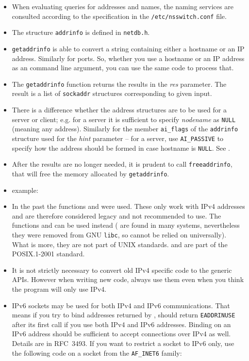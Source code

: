 \begin{itemize}
\item When evaluating queries for addresses and names, the naming services
are consulted according to the specification in the \texttt{/etc/nsswitch.conf}
file.
\item The structure \texttt{addrinfo} is defined in \texttt{netdb.h}.
\item \texttt{getaddrinfo} is able to convert a string containing either a
hostname or an IP address. Similarly for ports.  So, whether you use a hostname
or an IP address as an command line argument, you can use the same code to
process that.
\item The \texttt{getaddrinfo} function returns the results in the \emph{res}
parameter. The result is a list of \texttt{sockaddr} structures corresponding to
given input.
\item There is a difference whether the address structures are to be used for a
server or client; e.g. for a server it is sufficient to specify \emph{nodename}
as \texttt{NULL} (meaning any address).  Similarly for the member
\texttt{ai\_flags} of the \texttt{addrinfo} structure used for the \emph{hint}
parameter -- for a server, use \texttt{AI\_PASSIVE} to specify how the address
should be formed in case hostname is \texttt{NULL}.
See .
\item After the results are no longer needed, it is prudent to call
\texttt{freeaddrinfo}, that will free the memory allocated by
\texttt{getaddrinfo}.
\item {} example: 
\item In the past the functions  and
 were used. These only work with IPv4 addresses and are
therefore considered legacy and not recommended to use. The functions
 and  can be used
instead ( are found in many systems, nevertheless they were
removed from GNU \texttt{libc}, so cannot be relied on universally). What is
more, they are not part of UNIX standards.   and
 are part of the POSIX.1-2001 standard.
\item It is not strictly necessary to convert old IPv4 specific code to the
generic APIs. However when writing new code, always use them even when you think
the program will only use IPv4.
\item IPv6 sockets may be used for both IPv4 and IPv6 communications.  That
means if you try to bind addresses returned by , 
should return \texttt{EADDRINUSE} after its first call if you use both IPv4 and
IPv6 addresses.  Binding on an IPv6 address should be sufficient to accept
connections over IPv4 as well.  Details are in RFC~3493.  If you want to
restrict a socket to IPv6 only, use the following code on a socket from the
\texttt{AF\_INET6} family:


\end{itemize}
